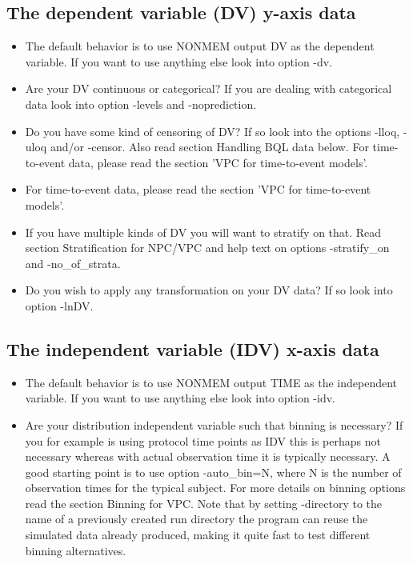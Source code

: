 \subsection{The dependent variable (DV) y-axis data}

\begin{itemize}
	\item The default behavior is to use NONMEM output DV as the dependent variable. If you want to use anything else look into option -dv.
	\item Are your DV continuous or categorical? If you are dealing with categorical data look into option -levels and -noprediction.
	\item Do you have some kind of censoring of DV? If so look into the options -lloq, -uloq and/or -censor. Also read section Handling BQL data below. For time-to-event data, please read the section 'VPC for time-to-event models'.
	\item For time-to-event data, please read the section 'VPC for time-to-event models'.
	\item If you have multiple kinds of DV you will want to stratify on that. Read section Stratification for NPC/VPC and help text on options -stratify\_on and -no\_of\_strata.
	\item Do you wish to apply any transformation on your DV data? If so look into option -lnDV.
\end{itemize}

\subsection{The independent variable (IDV) x-axis data}

\begin{itemize}
\item The default behavior is to use NONMEM output TIME as the independent variable. If you want to use anything else look into option -idv.
\item Are your distribution independent variable such that binning is necessary? If you for example is using protocol time points as IDV this is perhaps not necessary whereas with actual observation time it is typically necessary. A good starting point is to use option -auto\_bin=N, where N is the number of observation times for the typical subject. For more details on binning options read the section Binning for VPC. Note that by setting -directory to the name of a previously created run directory the program can reuse the simulated data already produced, making it quite fast to test different binning alternatives.
\end{itemize}

